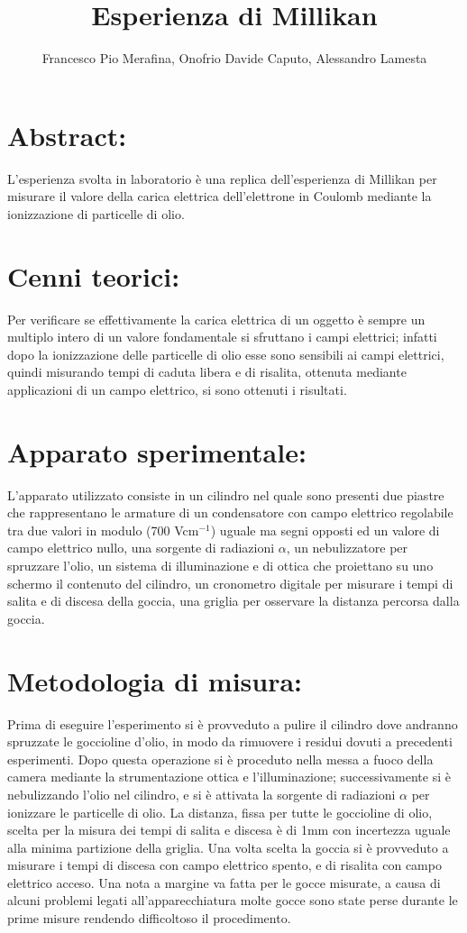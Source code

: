 \documentclass{article}
\title{Esperienza di Millikan}
\author{Francesco Pio Merafina, Onofrio Davide Caputo, Alessandro Lamesta}
\date{}
\begin{document}
\maketitle
\section{Abstract:}
L'esperienza svolta in laboratorio è una replica dell'esperienza di Millikan per misurare il valore della carica elettrica dell'elettrone in Coulomb mediante la ionizzazione di particelle di olio.
~
\section{Cenni teorici:}
Per verificare se effettivamente la carica elettrica di un oggetto è sempre un multiplo intero di un valore fondamentale si sfruttano i campi elettrici; infatti dopo la ionizzazione delle particelle di olio esse sono sensibili ai campi elettrici, quindi misurando tempi di caduta libera e di risalita, ottenuta mediante applicazioni di un campo elettrico, si sono ottenuti i risultati.
~
\section{Apparato sperimentale:}
L'apparato utilizzato consiste in un cilindro nel quale sono presenti due piastre che rappresentano le armature di un condensatore con campo elettrico regolabile tra due valori in modulo (700 Vcm$^{-1}$) uguale ma segni opposti ed un valore di campo elettrico nullo, una sorgente di radiazioni $\alpha$, un nebulizzatore per spruzzare l'olio, un sistema di illuminazione e di ottica che proiettano su uno schermo il contenuto del cilindro, un cronometro digitale per misurare i tempi di salita e di discesa della goccia, una griglia per osservare la distanza percorsa dalla goccia.
~
\section{Metodologia di misura:}
Prima di eseguire l'esperimento si è provveduto a pulire il cilindro dove andranno spruzzate le goccioline d'olio, in modo da rimuovere i residui dovuti a precedenti esperimenti. Dopo questa operazione si è proceduto nella messa a fuoco della camera mediante la strumentazione ottica e l'illuminazione; successivamente si è nebulizzando l'olio nel cilindro, e si è attivata la sorgente di radiazioni $\alpha$ per ionizzare le particelle di olio. La distanza, fissa per tutte le goccioline di olio, scelta per la misura dei tempi di salita e discesa è di 1mm con incertezza uguale alla minima partizione della griglia. Una volta scelta la goccia si è provveduto a misurare i tempi di discesa con campo elettrico spento, e di risalita con campo elettrico acceso. Una nota a margine va fatta per le gocce misurate, a causa di alcuni problemi legati all'apparecchiatura molte gocce sono state perse durante le prime misure rendendo difficoltoso il procedimento.
~
\end{document}
